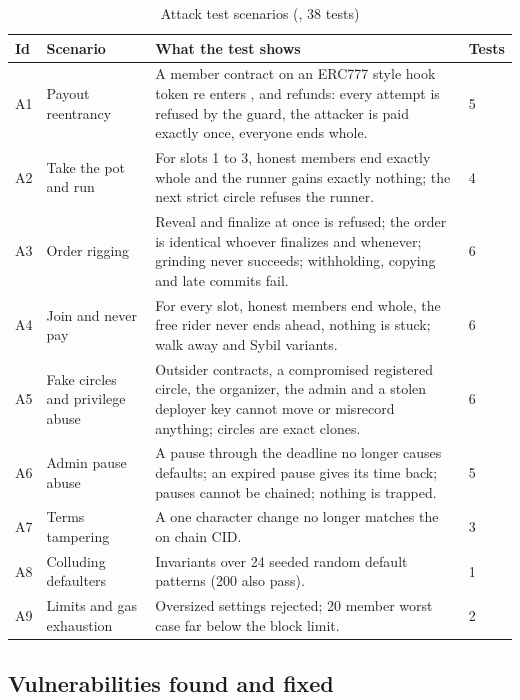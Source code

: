 \begin{table}[H]
\centering\small
\caption{Attack test scenarios (, 38 tests)}
\label{tab:attacks}
\begin{tabularx}{\textwidth}{@{}P{0.7cm}P{3.8cm}LP{0.8cm}@{}}
\toprule
Id & Scenario & What the test shows & Tests \\
\midrule
A1 & Payout reentrancy & A member contract on an ERC777 style hook token re enters ,  and refunds: every attempt is refused by the guard, the attacker is paid exactly once, everyone ends whole. & 5 \\
A2 & Take the pot and run & For slots 1 to 3, honest members end exactly whole and the runner gains exactly nothing; the next strict circle refuses the runner. & 4 \\
A3 & Order rigging & Reveal and finalize at once is refused; the order is identical whoever finalizes and whenever; grinding never succeeds; withholding, copying and late commits fail. & 6 \\
A4 & Join and never pay & For every slot, honest members end whole, the free rider never ends ahead, nothing is stuck; walk away and Sybil variants. & 6 \\
A5 & Fake circles and privilege abuse & Outsider contracts, a compromised registered circle, the organizer, the admin and a stolen deployer key cannot move or misrecord anything; circles are exact clones. & 6 \\
A6 & Admin pause abuse & A pause through the deadline no longer causes defaults; an expired pause gives its time back; pauses cannot be chained; nothing is trapped. & 5 \\
A7 & Terms tampering & A one character change no longer matches the on chain CID. & 3 \\
A8 & Colluding defaulters & Invariants over 24 seeded random default patterns (200 also pass). & 1 \\
A9 & Limits and gas exhaustion & Oversized settings rejected; 20 member worst case far below the block limit. & 2 \\
\bottomrule
\end{tabularx}
\end{table}

\subsection{Vulnerabilities found and fixed}

